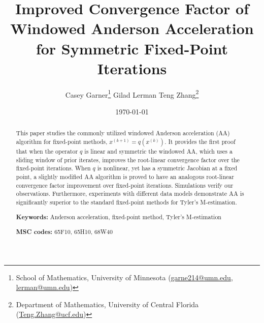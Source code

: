 \documentclass[11pt]{article}
\title{ 
Improved Convergence Factor of Windowed Anderson Acceleration for Symmetric Fixed-Point Iterations
}
\author{ Casey Garner\thanks{School of Mathematics, University of Minnesota (\href{mailto:garne214@umn.edu}{garne214@umn.edu}, \href{mailto:lerman@umn.edu}{lerman@umn.edu}) }
\hspace{1cm}
Gilad Lerman\footnotemark[1]
\hspace{1cm}
Teng Zhang\thanks{Department of Mathematics, University of Central Florida (\href{mailto:Teng.Zhang@ucf.edu}{Teng.Zhang@ucf.edu})}}
\date{\today}
\begin{document}
\maketitle

\vspace{-0.2in}


\begin{abstract}
{
This paper studies the commonly utilized windowed Anderson acceleration (AA) algorithm for fixed-point methods, $x^{(k+1)}=q(x^{(k)})$. It provides the first proof that when the operator $q$ is linear and symmetric the windowed AA, which uses a sliding window of prior iterates, improves the root-linear convergence factor over the fixed-point iterations. When $q$ is nonlinear, yet has a symmetric Jacobian at a fixed point, a slightly modified AA algorithm is proved to have an analogous root-linear convergence factor improvement over fixed-point iterations. 
Simulations verify our observations. Furthermore, experiments with different data models demonstrate AA is significantly superior to the standard fixed-point methods for Tyler's M-estimation.

\vspace{3mm}
    \noindent\textbf{Keywords:} 
Anderson acceleration, fixed-point method, Tyler's M-estimation

\vspace{3mm}
    \noindent\textbf{MSC codes:} 
     65F10, 65H10, 68W40
}

\end{abstract}
\end{document}
